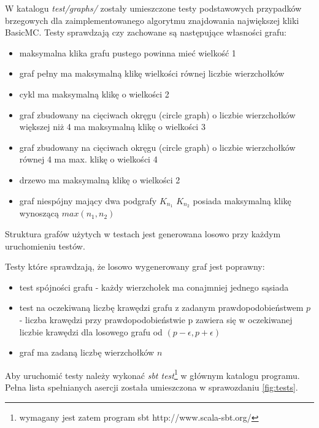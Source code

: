 \documentclass[12pt, a4paper]{article}
\begin{document}
W katalogu \textit{test/graphs/} zostały umieszczone testy podstawowych przypadków brzegowych dla zaimplementowanego algorytmu znajdowania największej kliki BasicMC.
Testy sprawdzają czy zachowane są następujące własności grafu:
\begin{itemize}
  \item maksymalna klika grafu pustego powinna mieć wielkość 1
  \item graf pełny ma maksymalną klikę wielkości równej liczbie wierzchołków
  \item cykl ma maksymalną klikę o wielkości 2
  \item graf zbudowany na cięciwach okręgu (circle graph) o liczbie wierzchołków większej niż 4 ma maksymalną klikę o wielkości 3
  \item graf zbudowany na cięciwach okręgu (circle graph) o liczbie wierzchołków równej 4 ma max. klikę o wielkości 4
  \item drzewo ma maksymalną klikę o wielkości 2
  \item graf niespójny mający dwa podgrafy $K_{n_{1}}$ $K_{n_{2}}$ posiada maksymalną klikę wynoszącą $max(n_{1}, n_{2})$
\end{itemize}

Struktura grafów użytych w testach jest generowana losowo przy każdym uruchomieniu testów.

Testy które sprawdzają, że losowo wygenerowany graf jest poprawny:
\begin{itemize}
  \item test spójności grafu - każdy wierzchołek ma conajmniej jednego sąsiada
  \item test na oczekiwaną liczbę krawędzi grafu z zadanym prawdopodobieństwem $p$ - liczba krawędzi przy prawdopodobieństwie p zawiera się w oczekiwanej liczbie krawędzi dla losowego grafu od $(p - \epsilon, p + \epsilon)$
  \item graf ma zadaną liczbę wierzchołków $n$
\end{itemize}

Aby uruchomić testy należy wykonać \textit{sbt test}\footnote{wymagany jest zatem program sbt http://www.scala-sbt.org/} w głównym katalogu programu. Pełna lista spełnianych asercji została umieszczona w sprawozdaniu \ref{fig:tests}.
\end{document}
